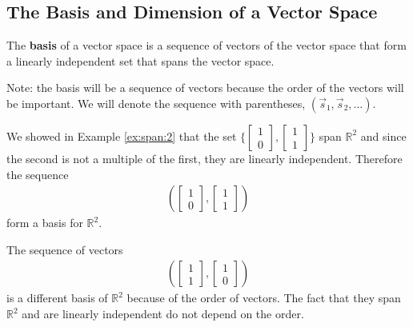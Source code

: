 \subsection{The Basis and Dimension of a Vector Space}

\begin{definition}
The \textbf{basis} of a vector space is a sequence of vectors of the vector space that form a linearly independent set that spans the vector space.  
\end{definition}

Note: the basis will be a sequence of vectors because the order of the vectors will be important.  We will denote the sequence with parentheses, $( \vec{s}_1, \vec{s}_2, \ldots )$.  


\begin{example}
We showed in Example \ref{ex:span:2} that the set $\displaystyle
\{ \begin{bmatrix}
1 \\ 0
\end{bmatrix}, \begin{bmatrix}
1 \\1 
\end{bmatrix} \} $ 
span $\mathbb{R}^2$ and since the second is not a multiple of the first, they are linearly independent.  Therefore the sequence
%
\begin{align*}
( \begin{bmatrix}
1 \\ 0
\end{bmatrix}, \begin{bmatrix}
1 \\1 
\end{bmatrix} )
\end{align*}
form a basis for $\mathbb{R}^2$.  
\end{example}

\begin{example}
The sequence of vectors \begin{align*}
( \begin{bmatrix}
1 \\ 1
\end{bmatrix}, \begin{bmatrix}
1 \\0 
\end{bmatrix} )
\end{align*}
is a different basis of $\mathbb{R}^2$ because of the order of vectors.  The fact that they span $\mathbb{R}^2$ and are linearly independent do not depend on the order. 
\end{example}

